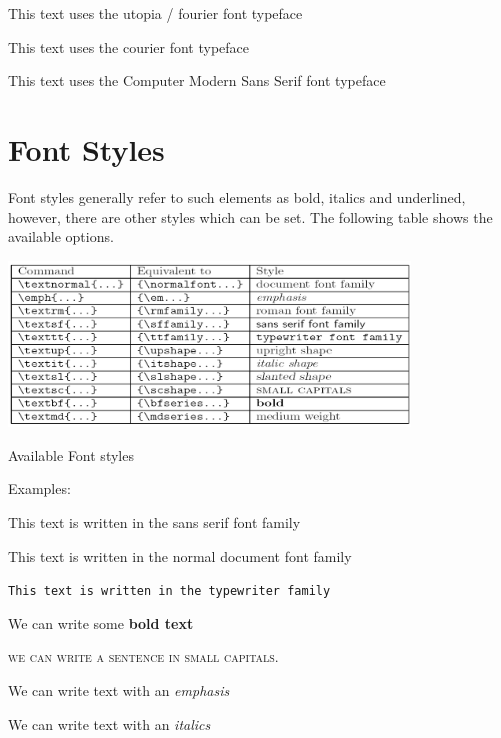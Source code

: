 {\selectfont This text uses the utopia / fourier font typeface}

{\selectfont This text uses the courier font typeface}

 {\selectfont This text uses the Computer Modern Sans Serif font typeface}

\newpage

\section{Font Styles}

Font styles generally refer to such elements as bold, italics and underlined, however, there are other styles which can be set. The following table shows the available options.

\begin{center}
    
\includegraphics[width=0.8\textwidth]{images/Latex_styles_table.png}

\scriptsize{Available Font styles}

\end{center}


\begin{adjustwidth}{2cm}{2cm}

Examples:

\textsf{This text is written in the sans serif font family}

\textnormal{This text is written in the normal document font family}

\texttt{This text is written in the typewriter family}

We can write some \textbf{bold text}

\textsc{we can write a sentence in small capitals.} 

We can write text with an \emph{emphasis}

We can write text with an \textit{italics}

\end{adjustwidth}

